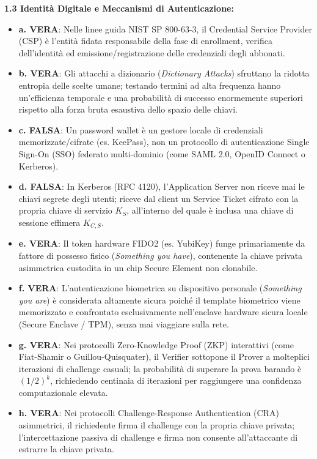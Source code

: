 \documentclass[11pt,a4paper]{article}
\begin{document}
\begin{solutionbox}
\textbf{1.3 Identit\`a Digitale e Meccanismi di Autenticazione:}
\begin{itemize}
    \item \textbf{a. VERA}: Nelle linee guida NIST SP 800-63-3, il Credential Service Provider (CSP) \`e l'entit\`a fidata responsabile della fase di enrollment, verifica dell'identit\`a ed emissione/registrazione delle credenziali degli abbonati.
    \item \textbf{b. VERA}: Gli attacchi a dizionario (\textit{Dictionary Attacks}) sfruttano la ridotta entropia delle scelte umane; testando termini ad alta frequenza hanno un'efficienza temporale e una probabilit\`a di successo enormemente superiori rispetto alla forza bruta esaustiva dello spazio delle chiavi.
    \item \textbf{c. FALSA}: Un password wallet \`e un gestore locale di credenziali memorizzate/cifrate (es. KeePass), non un protocollo di autenticazione Single Sign-On (SSO) federato multi-dominio (come SAML 2.0, OpenID Connect o Kerberos).
    \item \textbf{d. FALSA}: In Kerberos (RFC 4120), l'Application Server non riceve mai le chiavi segrete degli utenti; riceve dal client un Service Ticket cifrato con la propria chiave di servizio $K_S$, all'interno del quale \`e inclusa una chiave di sessione effimera $K_{C,S}$.
    \item \textbf{e. VERA}: Il token hardware FIDO2 (es. YubiKey) funge primariamente da fattore di possesso fisico (\textit{Something you have}), contenente la chiave privata asimmetrica custodita in un chip Secure Element non clonabile.
    \item \textbf{f. VERA}: L'autenticazione biometrica su dispositivo personale (\textit{Something you are}) \`e considerata altamente sicura poich\'e il template biometrico viene memorizzato e confrontato esclusivamente nell'enclave hardware sicura locale (Secure Enclave / TPM), senza mai viaggiare sulla rete.
    \item \textbf{g. VERA}: Nei protocolli Zero-Knowledge Proof (ZKP) interattivi (come Fiat-Shamir o Guillou-Quisquater), il Verifier sottopone il Prover a molteplici iterazioni di challenge casuali; la probabilit\`a di superare la prova barando \`e $(1/2)^k$, richiedendo centinaia di iterazioni per raggiungere una confidenza computazionale elevata.
    \item \textbf{h. VERA}: Nei protocolli Challenge-Response Authentication (CRA) asimmetrici, il richiedente firma il challenge con la propria chiave privata; l'intercettazione passiva di challenge e firma non consente all'attaccante di estrarre la chiave privata.
\end{itemize}


\end{solutionbox}
\end{document}
